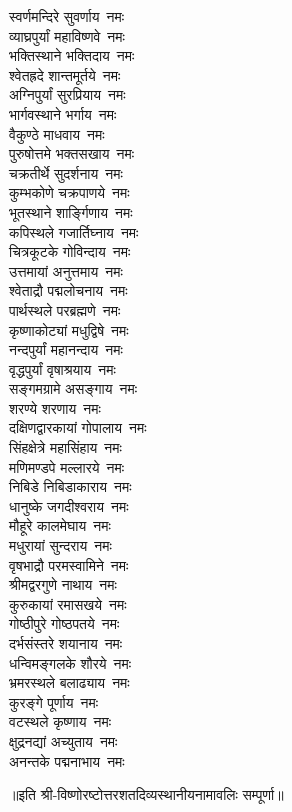 \begin{multicols}{2}
\begin{flushleft}
स्वर्णमन्दिरे सुवर्णाय~नमः\\
व्याघ्रपुर्यां महाविष्णवे~नमः\\
भक्तिस्थाने भक्तिदाय~नमः\\
श्वेतह्रदे शान्तमूर्तये~नमः\\
अग्निपुर्यां सुरप्रियाय~नमः\\
भार्गवस्थाने भर्गाय~नमः\\
वैकुण्ठे माधवाय~नमः\hfill{}\\
पुरुषोत्तमे भक्तसखाय~नमः\\
चक्रतीर्थे सुदर्शनाय~नमः\\
कुम्भकोणे चक्रपाणये~नमः\\
भूतस्थाने शार्ङ्गिणाय~नमः\\
कपिस्थले गजार्तिघ्नाय~नमः\\
चित्रकूटके गोविन्दाय~नमः\\
उत्तमायां अनुत्तमाय~नमः\\
श्वेताद्रौ पद्मलोचनाय~नमः\\
पार्थस्थले परब्रह्मणे~नमः\\
कृष्णाकोट्यां मधुद्विषे~नमः\hfill{}\\
नन्दपुर्यां महानन्दाय~नमः\\
वृद्धपुर्यां वृषाश्रयाय~नमः\\
सङ्गमग्रामे असङ्गाय~नमः\\
शरण्ये शरणाय~नमः\\
दक्षिणद्वारकायां गोपालाय~नमः\\
सिंहक्षेत्रे महासिंहाय~नमः\\
मणिमण्डपे मल्लारये~नमः\\
निबिडे निबिडाकाराय~नमः\\
धानुष्के जगदीश्वराय~नमः\\
मौहूरे कालमेघाय~नमः\hfill{}\\
मधुरायां सुन्दराय~नमः\\
वृषभाद्रौ परमस्वामिने~नमः\\
श्रीमद्वरगुणे नाथाय~नमः\\
कुरुकायां रमासखये~नमः\\
गोष्ठीपुरे गोष्ठपतये~नमः\\
दर्भसंस्तरे शयानाय~नमः\\
धन्विमङ्गलके शौरये~नमः\\
भ्रमरस्थले बलाढ्याय~नमः\\
कुरङ्गे पूर्णाय~नमः\\
वटस्थले कृष्णाय~नमः\hfill{}\\
क्षुद्रनद्यां अच्युताय~नमः\\
अनन्तके पद्मनाभाय~नमः\\
\end{flushleft}
\end{multicols}
॥इति श्री-विष्णोरष्टोत्तरशतदिव्यस्थानीयनामावलिः सम्पूर्णा॥
